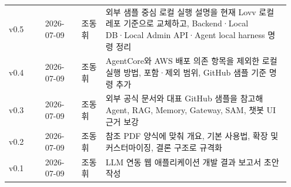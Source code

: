 \documentclass[12pt,a4paper]{article}
\begin{document}
\begin{footnotesize}
\begin{longtable}{@{}>{\centering\arraybackslash}m{0.125\linewidth}>{\centering\arraybackslash}m{0.125\linewidth}>{\centering\arraybackslash}m{0.083\linewidth}>{\RaggedRight\arraybackslash}m{0.614\linewidth}@{}}
v0.5 & {\footnotesize 2026-\allowbreak{}07-\allowbreak{}09} & 조동휘 & 외부 샘플 중심 로컬 실행 설명을 현재 Lovv 로컬 레포 기준으로 교체하고, Backend·Local DB·Local Admin API·Agent local harness 명령 정리 \\
v0.4 & {\footnotesize 2026-\allowbreak{}07-\allowbreak{}09} & 조동휘 & AgentCore와 AWS 배포 의존 항목을 제외한 로컬 실행 방법, 포함·제외 범위, GitHub 샘플 기준 명령 추가 \\
v0.3 & {\footnotesize 2026-\allowbreak{}07-\allowbreak{}09} & 조동휘 & 외부 공식 문서와 대표 GitHub 샘플을 참고해 Agent, RAG, Memory, Gateway, SAM, 챗봇 UI 근거 보강 \\
v0.2 & {\footnotesize 2026-\allowbreak{}07-\allowbreak{}09} & 조동휘 & 참조 PDF 양식에 맞춰 개요, 기본 사용법, 확장 및 커스터마이징, 결론 구조로 규격화 \\
v0.1 & {\footnotesize 2026-\allowbreak{}07-\allowbreak{}09} & 조동휘 & LLM 연동 웹 애플리케이션 개발 결과 보고서 초안 작성 \\
\bottomrule
\end{longtable}
\end{footnotesize}
\end{document}
